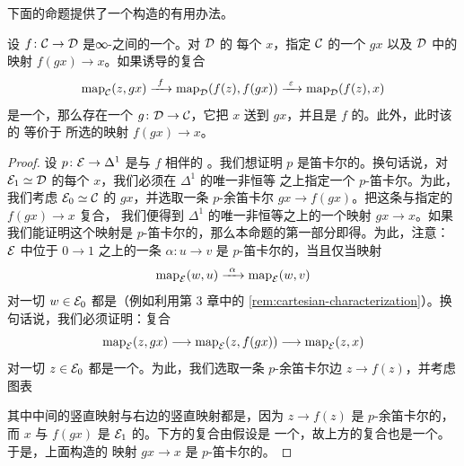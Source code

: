 下面的命题提供了一个构造\trFunctor{}的有用办法。

\begin{proposition}\label{prop:right-adjoint-criterion}
设 $f\colon \mathcal{C} \to \mathcal{D}$ 是∞-\trCategories{}之间的一个\trFunctor{}。对 $\mathcal{D}$ 的
每个\trObject{} $x$，指定 $\mathcal{C}$ 的一个\trObject{} $gx$ 以及 $\mathcal{D}$ 中的映射
$f(gx) \to x$。如果诱导的复合
\[
\mathrm{map}_{\C}(z, gx) \xrightarrow{\ f\ } \mathrm{map}_{\D}(f(z), f(gx))
  \xrightarrow{\ \varepsilon\ } \mathrm{map}_{\D}(f(z), x)
\]
是一个\trEquivalence{}，那么存在一个\trFunctor{} $g\colon \mathcal{D} \to \mathcal{C}$，它把 $x$
送到 $gx$，并且是 $f$ 的\trRightAdjoint{}。此外，此时该\trAdjunction{}的%
\trCounit{}等价于
所选的映射 $f(gx) \to x$。
\end{proposition}

\begin{proof}
设 $p\colon \mathcal{E} \to \Delta^1$ 是与\trFunctor{} $f$ 相伴的%
\trCocartesianFibration{}。我们想证明 $p$ 是笛卡尔的。换句话说，对
$\mathcal{E}_1 \simeq \mathcal{D}$ 的每个\trObject{} $x$，我们必须在 $\Delta^1$ 的唯一非恒等%
\trMorphism{}之上指定一个 $p$-笛卡尔\trMorphism{}。为此，我们考虑
$\mathcal{E}_0 \simeq \mathcal{C}$ 的\trObject{} $gx$，并选取一条 $p$-余笛卡尔\trMorphism{}%
$gx \to f(gx)$。把这条\trMorphism{}与指定的\trMorphism{} $f(gx) \to x$ 复合，
我们便得到 $\Delta^1$ 的唯一非恒等\trMorphism{}之上的一个映射 $gx \to x$。如果
我们能证明这个映射是 $p$-笛卡尔的，那么本命题的第一部分即得。为此，注意：
$\mathcal{E}$ 中位于 $0 \to 1$ 之上的一条\trMorphism{} $\alpha\colon u \to v$ 是
$p$-笛卡尔的，当且仅当映射
\[
\mathrm{map}_{\E}(w, u) \xrightarrow{\ \alpha\ } \mathrm{map}_{\E}(w, v)
\]
对一切 $w \in \mathcal{E}_0$ 都是\trHomotopyEquivalence{}（例如利用第 3 章中的%
\cref{rem:cartesian-characterization}）。换句话说，我们必须证明：复合
\[
\mathrm{map}_{\mathcal{E}}(z, gx) \longrightarrow \mathrm{map}_{\mathcal{E}}(z, f(gx))
  \longrightarrow \mathrm{map}_{\mathcal{E}}(z, x)
\]
对一切 $z \in \mathcal{E}_0$ 都是一个\trEquivalence{}。为此，我们选取一条 $p$-余笛卡尔边
$z \to f(z)$，并考虑图表
\begin{center}
\end{center}
其中中间的竖直映射与右边的竖直映射都是\trEquivalence{}，因为 $z \to f(z)$ 是
$p$-余笛卡尔的，而 $x$ 与 $f(gx)$ 是 $\mathcal{E}_1$ 的\trObject{}。下方的复合由假设是
一个\trEquivalence{}，故上方的复合也是一个\trEquivalence{}。于是，上面构造的
映射 $gx \to x$ 是 $p$-笛卡尔的。


\end{proof}
